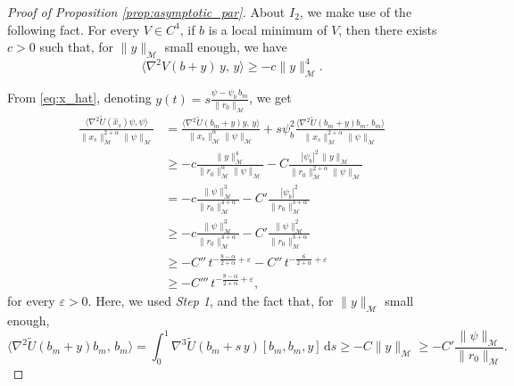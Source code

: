 \documentclass[10pt,a4paper]{amsart}
\newcommand{\ud}{\mathrm{d}}
\begin{document}
\begin{proof}[Proof of Proposition \ref{prop:asymptotic_par}]
About $I_2$, we make use of the following fact. For every $V \in C^4$, if $b$ is a local minimum of $V$, then there exists $c>0$ such that, for $\|y\|_\mathcal{M}$ small enough, we have
\[
\langle \nabla^2 V(b+y)\,y,\,y\rangle \ge -c \|y\|_\mathcal{M}^4.
\]

From \eqref{eq:x_hat}, denoting  $y(t)=s\frac{\psi-\psi_b\,b_m}{\|r_0\|_\mathcal{M}}$, we get
\[
\begin{aligned}
\frac{\langle\nabla^2 \tilde U(\hat x_s)\psi, \psi\rangle}{\|x_s\|_\mathcal{M}^{2+\alpha}\|\psi\|_\mathcal{M}} &= \frac{\langle \nabla^2 \tilde U(b_m+y)y,\,y\rangle}{\|x_s\|_\mathcal{M}^{\alpha}\|\psi\|_\mathcal{M}}+s\psi_b^2\frac{\langle \nabla^2 \tilde U(b_m+y) b_m, \, b_m\rangle}{\|x_s\|_\mathcal{M}^{2+\alpha}\|\psi\|_\mathcal{M}}
\\
&\ge -c \frac{\|y\|_\mathcal{M}^4}{\|r_0\|_\mathcal{M}^\alpha \|\psi\|_\mathcal{M}}-C\frac{|\psi_b|^2\,\|y\|_\mathcal{M}}{\|r_0\|_\mathcal{M}^{2+\alpha} \|\psi\|_\mathcal{M}}
\\
&= -c \frac{\|\psi\|_\mathcal{M}^3}{\|r_0\|_\mathcal{M}^{4+\alpha}}-C'\frac{|\psi_b|^2}{\|r_0\|_\mathcal{M}^{3+\alpha}}
\\
&\ge -c \frac{\|\psi\|_\mathcal{M}^3}{\|r_0\|_\mathcal{M}^{4+\alpha}}-C'\frac{\|\psi\|_\mathcal{M}^2}{\|r_0\|_\mathcal{M}^{3+\alpha}}
\\
&\ge -C''\,t^{-\frac{8-\alpha}{2+\alpha}+\varepsilon}-C''\,t^{-\frac{6}{2+\alpha}+\varepsilon}
\\
&\ge -C'''\,t^{{-\frac{8-\alpha}{2+\alpha}}+\varepsilon},
\end{aligned}
\]
for every $\varepsilon>0$. Here, we used {\em Step 1}, and the fact that, for $\|y\|_\mathcal{M}$ small enough,
\[
\langle \nabla^2 \tilde U(b_m+y)b_m,\,b_m\rangle = \int_0^1 \nabla^3 \tilde U(b_m+s\,y)[b_m,b_m,y]\,\ud s\ge -C\|y\|_\mathcal{M}\ge -C' \frac{\|\psi\|_\mathcal{M}}{\|r_0\|_\mathcal{M}}.
\]


\end{proof}
\end{document}
